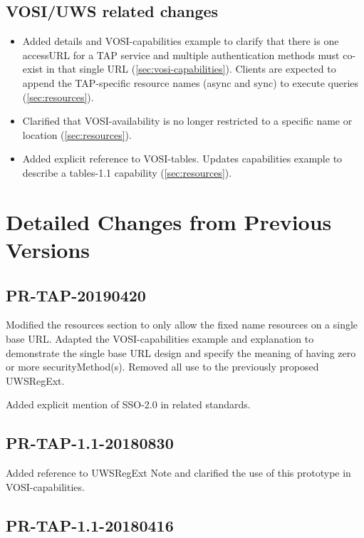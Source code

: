 \documentclass[11pt,letter]{ivoa}
\begin{document}
\subsection{VOSI/UWS related changes}

\begin{itemize}
\item Added details and VOSI-capabilities example to clarify that there is one accessURL for a TAP service and
multiple authentication methods must co-exist in that single URL (\ref{sec:vosi-capabilities}). Clients are
expected to append the TAP-specific resource names (async and sync) to execute queries (\ref{sec:resources}).

\item Clarified that VOSI-availability is no longer restricted to a
specific name or location (\ref{sec:resources}).

\item Added explicit reference to VOSI-tables. Updates capabilities example to describe a
tables-1.1 capability (\ref{sec:resources}).
\end{itemize}

\section{Detailed Changes from Previous Versions}

\subsection{PR-TAP-20190420}

Modified the resources section to only allow the fixed name resources on a single base URL. Adapted the 
VOSI-capabilities example and explanation to demonstrate the single base URL design and specify the meaning
of having zero or more securityMethod(s). Removed all use to the previously proposed UWSRegExt.

Added explicit mention of SSO-2.0 in related standards.

\subsection{PR-TAP-1.1-20180830}

Added reference to UWSRegExt Note and clarified the use of this prototype in VOSI-capabilities.

\subsection{PR-TAP-1.1-20180416}
\end{document}
